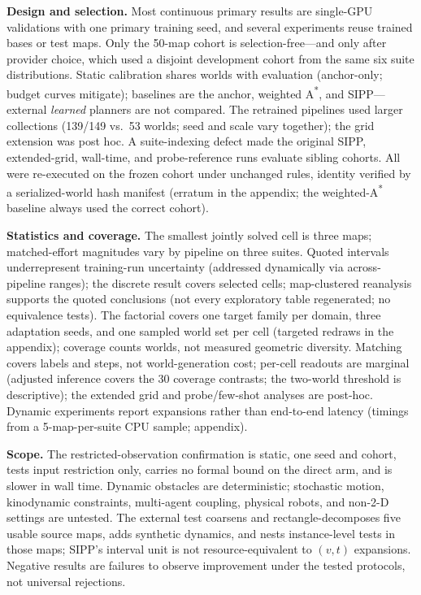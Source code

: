 \documentclass[letterpaper]{article} %
\begin{document}
\textbf{Design and selection.} Most continuous primary results are single-GPU validations with one primary training seed, and several experiments reuse trained bases or test maps. Only the 50-map cohort is selection-free---and only after provider choice, which used a disjoint development cohort from the same six suite distributions. Static calibration shares worlds with evaluation (anchor-only; budget curves mitigate); baselines are the anchor, weighted A\textsuperscript{*}, and SIPP---external \emph{learned} planners are not compared. The retrained pipelines used larger collections (139/149 vs.\ 53 worlds; seed and scale vary together); the grid extension was post hoc. A suite-indexing defect made the original SIPP, extended-grid, wall-time, and probe-reference runs evaluate sibling cohorts. All were re-executed on the frozen cohort under unchanged rules, identity verified by a serialized-world hash manifest (erratum in the appendix; the weighted-A\textsuperscript{*} baseline always used the correct cohort).

\textbf{Statistics and coverage.} The smallest jointly solved cell is three maps; matched-effort magnitudes vary by pipeline on three suites. Quoted intervals underrepresent training-run uncertainty (addressed dynamically via across-pipeline ranges); the discrete result covers selected cells; map-clustered reanalysis supports the quoted conclusions (not every exploratory table regenerated; no equivalence tests). The factorial covers one target family per domain, three adaptation seeds, and one sampled world set per cell (targeted redraws in the appendix); coverage counts worlds, not measured geometric diversity. Matching covers labels and steps, not world-generation cost; per-cell readouts are marginal (adjusted inference covers the 30 coverage contrasts; the two-world threshold is descriptive); the extended grid and probe/few-shot analyses are post-hoc. Dynamic experiments report expansions rather than end-to-end latency (timings from a 5-map-per-suite CPU sample; appendix).

\textbf{Scope.} The restricted-observation confirmation is static, one seed and cohort, tests input restriction only, carries no formal bound on the direct arm, and is slower in wall time. Dynamic obstacles are deterministic; stochastic motion, kinodynamic constraints, multi-agent coupling, physical robots, and non-2-D settings are untested. The external test coarsens and rectangle-decomposes five usable source maps, adds synthetic dynamics, and nests instance-level tests in those maps; SIPP's interval unit is not resource-equivalent to $(v,t)$ expansions. Negative results are failures to observe improvement under the tested protocols, not universal rejections.
\end{document}
